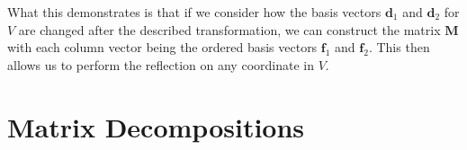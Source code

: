 \documentclass[a4paper,12pt]{book}
\newcommand{\matrx}[1]{\bm{#1}}
\newcommand{\vectr}[1]{\textbf{#1}}
\begin{document}
	What this demonstrates is that if we consider how the basis vectors $ \vectr{d}_1 $ and $ \vectr{d}_2 $ for $ V $ are changed after the described transformation, we can construct the matrix $ \matrx{M} $ with each column vector being the ordered basis vectors $ \vectr{f}_1 $ and $ \vectr{f}_2 $. This then allows us to perform the reflection on any coordinate in $ V $. 
	\section{Matrix Decompositions}
	
  	\printbibliography
\end{document}
